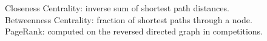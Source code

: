 \documentclass[preview]{standalone}
\begin{document}
Closeness Centrality: inverse sum of shortest path distances.\\Betweenness Centrality: fraction of shortest paths through a node.\\PageRank: computed on the reversed directed graph in competitions.\\
\end{document}
